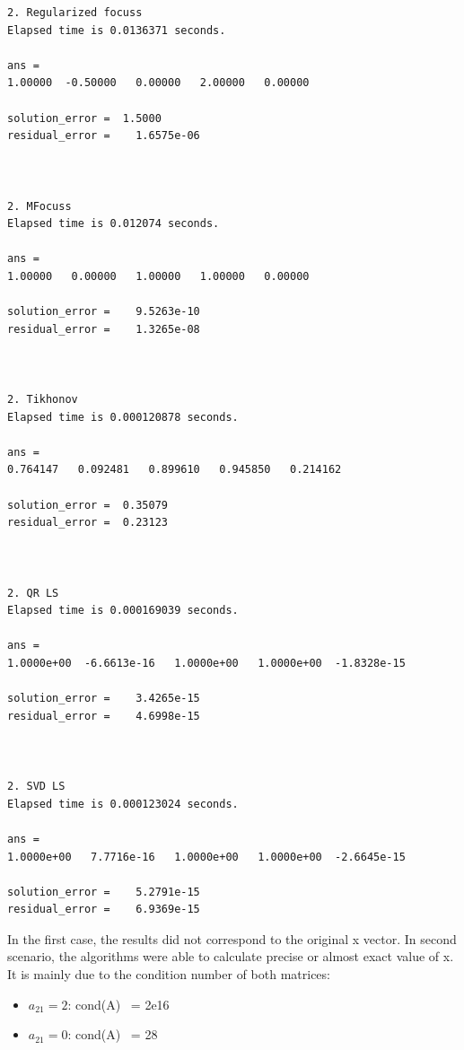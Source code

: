 \documentclass[eng,openany]{mgr}
\begin{document}
\begin{lstlisting}
2. Regularized focuss
Elapsed time is 0.0136371 seconds.

ans =
1.00000  -0.50000   0.00000   2.00000   0.00000

solution_error =  1.5000
residual_error =    1.6575e-06



2. MFocuss
Elapsed time is 0.012074 seconds.

ans =
1.00000   0.00000   1.00000   1.00000   0.00000

solution_error =    9.5263e-10
residual_error =    1.3265e-08



2. Tikhonov
Elapsed time is 0.000120878 seconds.

ans =
0.764147   0.092481   0.899610   0.945850   0.214162

solution_error =  0.35079
residual_error =  0.23123



2. QR LS
Elapsed time is 0.000169039 seconds.

ans =
1.0000e+00  -6.6613e-16   1.0000e+00   1.0000e+00  -1.8328e-15

solution_error =    3.4265e-15
residual_error =    4.6998e-15



2. SVD LS
Elapsed time is 0.000123024 seconds.

ans =
1.0000e+00   7.7716e-16   1.0000e+00   1.0000e+00  -2.6645e-15

solution_error =    5.2791e-15
residual_error =    6.9369e-15
\end{lstlisting}

In the first case, the results did not correspond to the original x vector. In second scenario, the algorithms were able to  calculate precise or almost exact value of x.
It is mainly due to the condition number of both matrices:
\begin{itemize}
	\item $a_{21} = 2 $: cond(A) ~= 2e16
	\item $a_{21} = 0 $: cond(A) ~= 28
\end{itemize}
\end{document}
